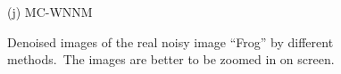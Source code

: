 \documentclass[10pt,onecolumn,letterpaper]{article}
\begin{document}
\begin{figure}
{\begin{minipage}[t]{0.2\textwidth}
{\footnotesize (j) MC-WNNM  }
\end{minipage}
}
\vspace{-2mm}
\caption{Denoised images of the real noisy image ``Frog'' \cite{ncwebsite} by different methods.\ The images are better to be zoomed in on screen.}
\label{f3}
\vspace{-2mm}
\end{figure}


\begin{figure}
\centering
{}
\end{figure}
\end{document}
